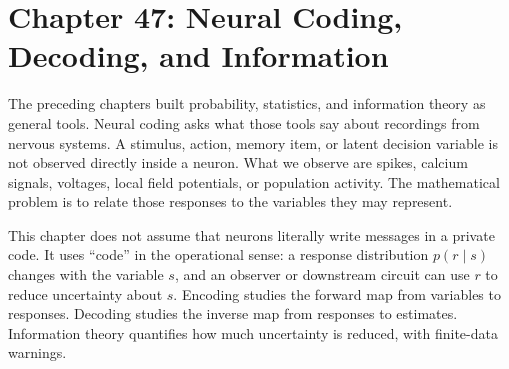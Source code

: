 \section{Chapter 47: Neural Coding, Decoding, and Information}
\label{ch:neural-coding-decoding-information}

The preceding chapters built probability, statistics, and information theory as general tools. Neural coding asks what those tools say about recordings from nervous systems. A stimulus, action, memory item, or latent decision variable is not observed directly inside a neuron. What we observe are spikes, calcium signals, voltages, local field potentials, or population activity. The mathematical problem is to relate those responses to the variables they may represent.

This chapter does not assume that neurons literally write messages in a private code. It uses ``code'' in the operational sense: a response distribution \(p(r\mid s)\) changes with the variable \(s\), and an observer or downstream circuit can use \(r\) to reduce uncertainty about \(s\). Encoding studies the forward map from variables to responses. Decoding studies the inverse map from responses to estimates. Information theory quantifies how much uncertainty is reduced, with finite-data warnings.


